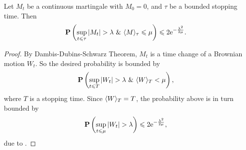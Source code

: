 \begin{corollary}\label{cor:EMI}
    Let $M_t$ be a continuous martingale with \(M_0=0\), and $\tau$ be a bounded stopping time. Then 
     \[
     \bP\left(\sup_{t\leq \tau} |M_t|>\lambda~ \&~ \<M\>_\tau\leq\mu\right)\leq 2\e^{-\frac{\lambda^2}{2\mu}}.
     \]
\end{corollary}
\begin{proof}
    By Dambis-Dubins-Schwarz Theorem, $M_t$ is a time change of a Brownian motion $W_t$. So the desired probability is bounded by 
    \[
        \bP\left(\sup_{t\leq T} |W_t|>\lambda~ \&~ \<W\>_T<\mu\right),
    \]
    where $T$ is a stopping time. Since $\langle W\rangle_T=T$, the probability above is in turn bounded by
    \[
        \bP\left(\sup_{t\leq \mu} |W_t|>\lambda\right)\leq 2\e^{-\frac{\lambda^2}{2\mu}}, 
    \]
    due to . 
 \end{proof}
 
